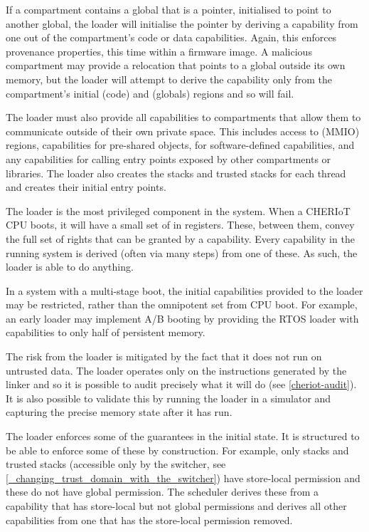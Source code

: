 If a compartment contains a global that is a pointer, initialised to point to another global, the loader will initialise the pointer by deriving a capability from one out of the compartment's code or data capabilities.
Again, this enforces provenance properties, this time within a firmware image.
A malicious compartment may provide a relocation that points to a global outside its own memory, but the loader will attempt to derive the capability only from the compartment's initial  (code) and  (globals) regions and so will fail.

The loader must also provide all capabilities to compartments that allow them to communicate outside of their own private space.
This includes access to  (MMIO) regions, capabilities for pre-shared objects, for software-defined capabilities, and any capabilities for calling entry points exposed by other compartments or libraries.
The loader also creates the stacks and trusted stacks for each thread and creates their initial entry points.

The loader is the most privileged component in the system.
When a CHERIoT CPU boots, it will have a small set of  in registers.
These, between them, convey the full set of rights that can be granted by a capability.
Every capability in the running system is derived (often via many steps) from one of these.
As such, the loader is able to do anything.

\begin{note}
In a system with a multi-stage boot, the initial capabilities provided to the loader may be restricted, rather than the omnipotent set from CPU boot.
For example, an early loader may implement A/B booting by providing the RTOS loader with capabilities to only half of persistent memory.
\end{note}

The risk from the loader is mitigated by the fact that it does not run on untrusted data.
The loader operates only on the instructions generated by the linker and so it is possible to audit precisely what it will do (see \ref{cheriot-audit}).
It is also possible to validate this by running the loader in a simulator and capturing the precise memory state after it has run.

The loader enforces some of the guarantees in the initial state.
It is structured to be able to enforce some of these by construction.
For example, only stacks and trusted stacks (accessible only by the switcher, see \ref{_changing_trust_domain_with_the_switcher}) have store-local permission and these do not have global permission.
The scheduler derives these from a capability that has store-local but not global permissions and derives all other capabilities from one that has the store-local permission removed.

